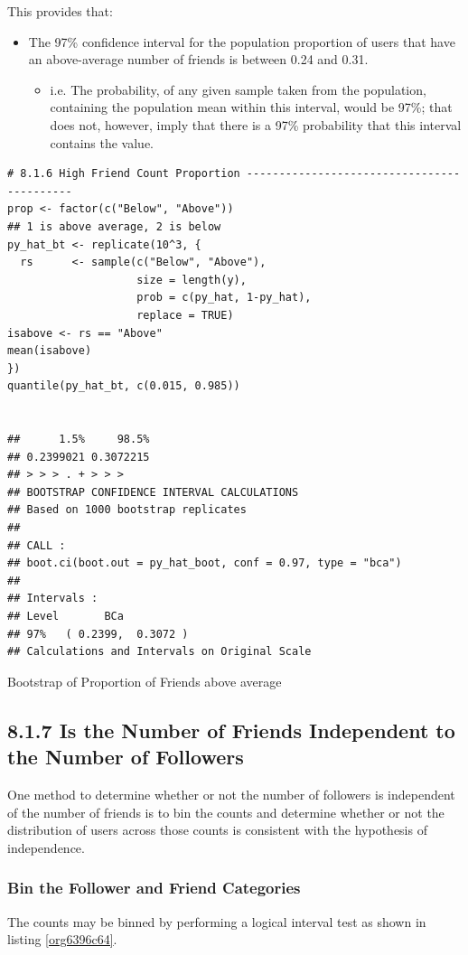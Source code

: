 \documentclass[11pt]{article}
\begin{document}
This provides that:
\begin{itemize}
\item The 97\% confidence interval for the population proportion of users that have
an above-average number of friends is between 0.24 and 0.31.
\begin{itemize}
\item i.e. The probability, of any given sample taken from the population,
containing the population mean within this interval, would be 97\%; that does
not, however, imply that there is a 97\% probability that this interval
contains the value.
\end{itemize}
\end{itemize}

\begin{listing}[htbp]
\begin{verbatim}
# 8.1.6 High Friend Count Proportion -------------------------------------------
prop <- factor(c("Below", "Above"))
## 1 is above average, 2 is below
py_hat_bt <- replicate(10^3, {
  rs      <- sample(c("Below", "Above"),
                    size = length(y),
                    prob = c(py_hat, 1-py_hat),
                    replace = TRUE)
isabove <- rs == "Above"
mean(isabove)
})
quantile(py_hat_bt, c(0.015, 0.985))


##      1.5%     98.5%
## 0.2399021 0.3072215
## > > > . + > > >
## BOOTSTRAP CONFIDENCE INTERVAL CALCULATIONS
## Based on 1000 bootstrap replicates
##
## CALL :
## boot.ci(boot.out = py_hat_boot, conf = 0.97, type = "bca")
##
## Intervals :
## Level       BCa
## 97%   ( 0.2399,  0.3072 )
## Calculations and Intervals on Original Scale
\end{verbatim}
\caption{\label{org060e5fe}Bootstrap of Proportion of Friends above average}
\end{listing}
\subsection{8.1.7 Is the Number of Friends Independent to the Number of Followers}
\label{sec:org0aa1b3b}
One method to determine whether or not the number of followers is independent of the number of friends is to bin the counts and determine whether or not the distribution of users across those counts is consistent with the hypothesis of independence.

\subsubsection{Bin the Follower and Friend Categories}
\label{sec:orgc353211}
The counts may be binned by performing a logical interval test as shown in listing \ref{org6396c64}.
\end{document}
